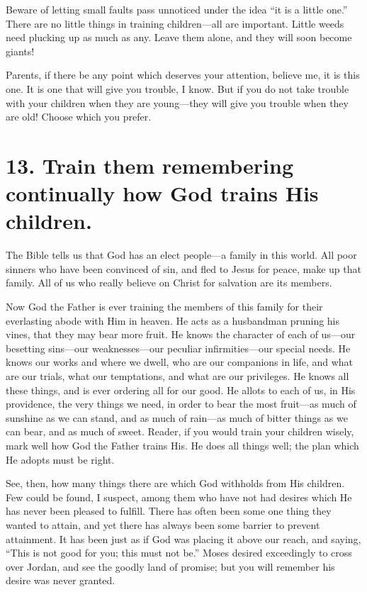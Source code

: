 \documentclass[
]{book}
\begin{document}
Beware of letting small faults pass unnoticed under the idea ``it is a little one.'' There are no little things in training children---all are important. Little weeds need plucking up as much as any. Leave them alone, and they will soon become giants!

Parents, if there be any point which deserves your attention, believe me, it is this one. It is one that will give you trouble, I know. But if you do not take trouble with your children when they are young---they will give you trouble when they are old! Choose which you prefer.

\hypertarget{train-them-remembering-continually-how-god-trains-his-children.}{%
\section*{13. Train them remembering continually how God trains His children.}\label{train-them-remembering-continually-how-god-trains-his-children.}}

The Bible tells us that God has an elect people---a family in this world. All poor sinners who have been convinced of sin, and fled to Jesus for peace, make up that family. All of us who really believe on Christ for salvation are its members.

Now God the Father is ever training the members of this family for their everlasting abode with Him in heaven. He acts as a husbandman pruning his vines, that they may bear more fruit. He knows the character of each of us---our besetting sins---our weaknesses---our peculiar infirmities---our special needs. He knows our works and where we dwell, who are our companions in life, and what are our trials, what our temptations, and what are our privileges. He knows all these things, and is ever ordering all for our good. He allots to each of us, in His providence, the very things we need, in order to bear the most fruit---as much of sunshine as we can stand, and as much of rain---as much of bitter things as we can bear, and as much of sweet. Reader, if you would train your children wisely, mark well how God the Father trains His. He does all things well; the plan which He adopts must be right.

See, then, how many things there are which God withholds from His children. Few could be found, I suspect, among them who have not had desires which He has never been pleased to fulfill. There has often been some one thing they wanted to attain, and yet there has always been some barrier to prevent attainment. It has been just as if God was placing it above our reach, and saying, ``This is not good for you; this must not be.'' Moses desired exceedingly to cross over Jordan, and see the goodly land of promise; but you will remember his desire was never granted.
\end{document}
